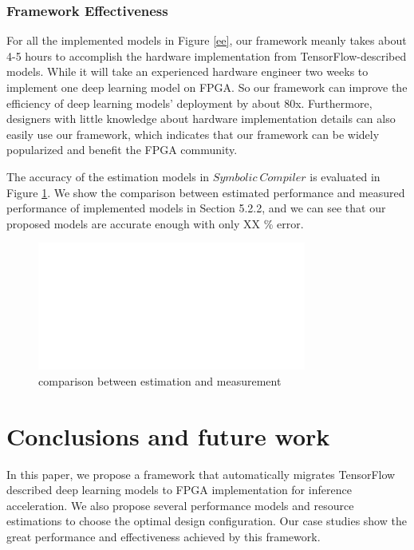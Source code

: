 \documentclass{acm_proc_article-sp-copy}
\begin{document}
\subsubsection{Framework Effectiveness}
For all the implemented models in Figure \ref{ee}, our framework meanly takes about 4-5 hours to accomplish the hardware implementation from TensorFlow-described models. While it will take an experienced hardware engineer two weeks to implement one deep learning model on FPGA. So our framework can improve the efficiency of deep learning models' deployment by about 80x. Furthermore, designers with little knowledge about hardware implementation details can also easily use our framework, which indicates that our framework can be widely popularized and benefit the FPGA community.

The accuracy of the estimation models in $Symbolic\ Compiler$ is evaluated in Figure \ref{estimate}. We show the comparison between estimated performance and measured performance of implemented models in Section 5.2.2, and we can see that our proposed models are accurate enough with only XX \% error.

\begin{figure}
	\centering
	\includegraphics[width=1.0\linewidth]{./figure/blank.jpg}
	\caption{comparison between estimation and measurement}
	\label{estimate}
\end{figure}


\section{Conclusions and future work}
In this paper, we propose a framework that automatically migrates TensorFlow described deep learning models to FPGA implementation for inference acceleration. We also propose several performance models and resource estimations to choose the optimal design configuration. Our case studies show the great performance and effectiveness achieved by this framework.
\end{document}
